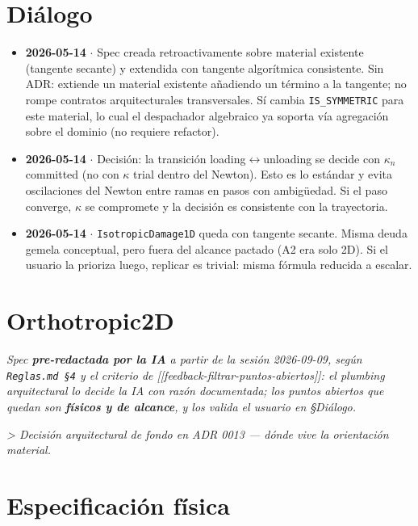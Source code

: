 \documentclass[11pt,letterpaper,oneside]{report}
\begin{document}
\section{Diálogo}

\begin{itemize}
  \item \textbf{2026-05-14} \ensuremath{\cdot} Spec creada retroactivamente sobre material existente (tangente secante) y extendida con tangente algorítmica consistente. Sin ADR: extiende un material existente añadiendo un término a la tangente; no rompe contratos arquitecturales transversales. Sí cambia \texttt{IS\_SYMMETRIC} para este material, lo cual el despachador algebraico ya soporta vía agregación sobre el dominio (no requiere refactor).
  \item \textbf{2026-05-14} \ensuremath{\cdot} Decisión: la transición loading\ensuremath{\leftrightarrow}unloading se decide con $\kappa_n$ committed (no con $\kappa$ trial dentro del Newton). Esto es lo estándar y evita oscilaciones del Newton entre ramas en pasos con ambigüedad. Si el paso converge, $\kappa$ se compromete y la decisión es consistente con la trayectoria.
  \item \textbf{2026-05-14} \ensuremath{\cdot} \texttt{IsotropicDamage1D} queda con tangente secante. Misma deuda gemela conceptual, pero fuera del alcance pactado (A2 era solo 2D). Si el usuario la prioriza luego, replicar es trivial: misma fórmula reducida a escalar.
\end{itemize}


\newpage

\section{Orthotropic2D}



\textit{Spec \textbf{pre-redactada por la IA} a partir de la sesión 2026-09-09, según \texttt{Reglas.md §4} y el criterio de [[feedback-filtrar-puntos-abiertos]]: el plumbing arquitectural lo decide la IA con razón documentada; los puntos abiertos que quedan son \textbf{físicos y de alcance}, y los valida el usuario en §Diálogo.}

\textit{> Decisión arquitectural de fondo en ADR 0013 --- dónde vive la orientación material.}



\section{Especificación física}
\end{document}
